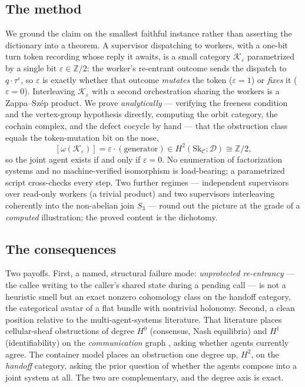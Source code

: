 \documentclass[11pt]{amsart}
\theoremstyle{definition}
\theoremstyle{remark}
\newcommand{\C}{\mathcal{C}}
\newcommand{\K}{\mathcal{K}}
\newcommand{\Sk}{\mathrm{Sk}}
\newcommand{\dir}{\mathcal{D}}
\begin{document}
\subsection*{The method}
We ground the claim on the smallest faithful instance rather than asserting the dictionary
into a theorem. A supervisor dispatching to workers, with a one-bit turn token recording
whose reply it awaits, is a small category $\K_\varepsilon$ parametrized by a single bit
$\varepsilon\in\mathbb Z/2$: the worker's re-entrant outcome sends the dispatch to
$q\cdot\tau^{\varepsilon}$, so $\varepsilon$ is exactly whether that outcome \emph{mutates}
the token ($\varepsilon=1$) or \emph{fixes} it ($\varepsilon=0$). Interleaving $\K_\varepsilon$
with a second orchestration sharing the workers is a Zappa--Sz\'ep product. We prove
\emph{analytically} --- verifying the freeness condition and the vertex-group hypothesis
directly, computing the orbit category, the cochain complex, and the defect cocycle by hand
--- that the obstruction class equals the token-mutation bit on the nose,
\[
  [\omega(\K_\varepsilon)]=\varepsilon\cdot(\text{generator})\in H^2(\Sk_\C;\dir)\cong\mathbb Z/2,
\]
so the joint agent exists if and only if $\varepsilon=0$. No enumeration of factorization
systems and no machine-verified isomorphism is load-bearing; a parametrized script
cross-checks every step. Two further regimes --- independent supervisors over read-only
workers (a trivial product) and two supervisors interleaving coherently into the non-abelian
join $S_3$ --- round out the picture at the grade of a \emph{computed} illustration; the
proved content is the dichotomy.

\subsection*{The consequences}
Two payoffs. First, a named, structural failure mode: \emph{unprotected re-entrancy} --- the
callee writing to the caller's shared state during a pending call --- is not a heuristic
smell but an exact nonzero cohomology class on the handoff category, the categorical avatar
of a flat bundle with nontrivial holonomy. Second, a clean position relative to the
multi-agent-systems literature. That literature places cellular-sheaf obstructions of degree
$H^0$ (consensus, Nash equilibria) and $H^1$ (identifiability) on the \emph{communication}
graph \cite{sheafMAS,sheafID,sheafPlan}, asking whether agents currently agree. The container
model places an obstruction one degree up, $H^2$, on the \emph{handoff} category, asking the
prior question of whether the agents compose into a joint system at all. The two are
complementary, and the degree axis is exact.
\end{document}
